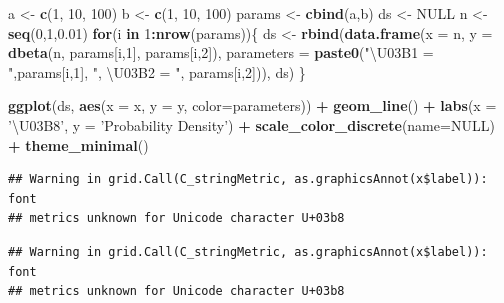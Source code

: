 \documentclass[]{book}
\newenvironment{Shaded}{\begin{snugshade}}{\end{snugshade}}
\newcommand{\KeywordTok}[1]{\textcolor[rgb]{0.13,0.29,0.53}{\textbf{#1}}}
\newcommand{\DataTypeTok}[1]{\textcolor[rgb]{0.13,0.29,0.53}{#1}}
\newcommand{\DecValTok}[1]{\textcolor[rgb]{0.00,0.00,0.81}{#1}}
\newcommand{\FloatTok}[1]{\textcolor[rgb]{0.00,0.00,0.81}{#1}}
\newcommand{\StringTok}[1]{\textcolor[rgb]{0.31,0.60,0.02}{#1}}
\newcommand{\OtherTok}[1]{\textcolor[rgb]{0.56,0.35,0.01}{#1}}
\newcommand{\ControlFlowTok}[1]{\textcolor[rgb]{0.13,0.29,0.53}{\textbf{#1}}}
\newcommand{\OperatorTok}[1]{\textcolor[rgb]{0.81,0.36,0.00}{\textbf{#1}}}
\newcommand{\NormalTok}[1]{#1}
\theoremstyle{definition}
\theoremstyle{definition}
\theoremstyle{definition}
\theoremstyle{remark}
\begin{document}
\begin{Shaded}
\begin{Highlighting}[]
\NormalTok{a <-}\StringTok{ }\KeywordTok{c}\NormalTok{(}\DecValTok{1}\NormalTok{, }\DecValTok{10}\NormalTok{, }\DecValTok{100}\NormalTok{)}
\NormalTok{b <-}\StringTok{ }\KeywordTok{c}\NormalTok{(}\DecValTok{1}\NormalTok{, }\DecValTok{10}\NormalTok{, }\DecValTok{100}\NormalTok{)}
\NormalTok{params <-}\StringTok{ }\KeywordTok{cbind}\NormalTok{(a,b)}
\NormalTok{ds <-}\StringTok{ }\OtherTok{NULL}
\NormalTok{n <-}\StringTok{ }\KeywordTok{seq}\NormalTok{(}\DecValTok{0}\NormalTok{,}\DecValTok{1}\NormalTok{,}\FloatTok{0.01}\NormalTok{)}
\ControlFlowTok{for}\NormalTok{(i }\ControlFlowTok{in} \DecValTok{1}\OperatorTok{:}\KeywordTok{nrow}\NormalTok{(params))\{}
\NormalTok{  ds <-}\StringTok{ }\KeywordTok{rbind}\NormalTok{(}\KeywordTok{data.frame}\NormalTok{(}\DataTypeTok{x =}\NormalTok{ n, }\DataTypeTok{y =} \KeywordTok{dbeta}\NormalTok{(n, params[i,}\DecValTok{1}\NormalTok{], params[i,}\DecValTok{2}\NormalTok{]),}
                             \DataTypeTok{parameters =} \KeywordTok{paste0}\NormalTok{(}\StringTok{"\textbackslash{}U03B1 = "}\NormalTok{,params[i,}\DecValTok{1}\NormalTok{],}
                                                 \StringTok{", \textbackslash{}U03B2 = "}\NormalTok{, params[i,}\DecValTok{2}\NormalTok{])), ds)}
\NormalTok{\}}

\KeywordTok{ggplot}\NormalTok{(ds, }\KeywordTok{aes}\NormalTok{(}\DataTypeTok{x =}\NormalTok{ x, }\DataTypeTok{y =}\NormalTok{ y, }\DataTypeTok{color=}\NormalTok{parameters)) }\OperatorTok{+}\StringTok{ }\KeywordTok{geom_line}\NormalTok{() }\OperatorTok{+}\StringTok{ }
\StringTok{  }\KeywordTok{labs}\NormalTok{(}\DataTypeTok{x =} \StringTok{'\textbackslash{}U03B8'}\NormalTok{, }\DataTypeTok{y =} \StringTok{'Probability Density'}\NormalTok{) }\OperatorTok{+}
\StringTok{  }\KeywordTok{scale_color_discrete}\NormalTok{(}\DataTypeTok{name=}\OtherTok{NULL}\NormalTok{) }\OperatorTok{+}\StringTok{ }\KeywordTok{theme_minimal}\NormalTok{()}
\end{Highlighting}
\end{Shaded}

\begin{verbatim}
## Warning in grid.Call(C_stringMetric, as.graphicsAnnot(x$label)): font
## metrics unknown for Unicode character U+03b8
\end{verbatim}

\begin{verbatim}
## Warning in grid.Call(C_stringMetric, as.graphicsAnnot(x$label)): font
## metrics unknown for Unicode character U+03b8
\end{verbatim}
\end{document}

